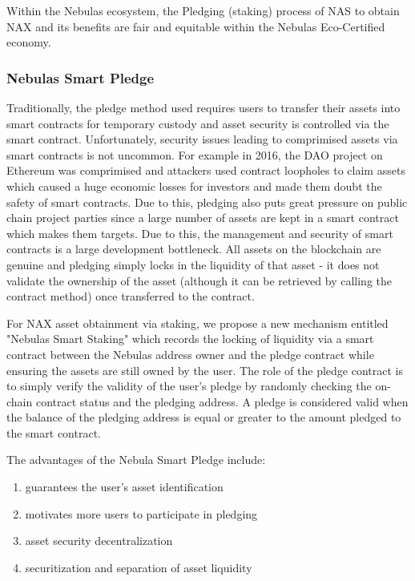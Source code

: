 Within the Nebulas ecosystem, the Pledging (staking) process of NAS to obtain NAX and its benefits are fair and equitable within the Nebulas Eco-Certified economy.

\subsubsection{Nebulas Smart Pledge}
Traditionally, the pledge method used requires users to transfer their assets into smart contracts for temporary custody and asset security is controlled via the smart contract. Unfortunately, security issues leading to comprimised assets via smart contracts is not uncommon. For example in 2016, the DAO project on Ethereum was comprimised and attackers used contract loopholes to claim assets which caused a huge economic losses for investors and made them doubt the safety of smart contracts. Due to this, pledging also puts great pressure on public chain project parties since a large number of assets are kept in a smart contract which makes them targets. Due to this, the management and security of smart contracts is a large development bottleneck. All assets on the blockchain are genuine and pledging simply locks in the liquidity of that asset - it does not validate the ownership of the asset (although it can be retrieved by calling the contract method) once transferred to the contract.

For NAX asset obtainment via staking, we propose a new mechanism entitled "Nebulas Smart Staking" which records the locking of liquidity via a smart contract between the Nebulas address owner and the pledge contract while ensuring the assets are still owned by the user. The role of the pledge contract is to simply verify the validity of the user's pledge by randomly checking the on-chain contract status and the pledging address. A  pledge is considered valid when the balance of the pledging address is equal or greater to the amount pledged to the smart contract.

The advantages of the Nebula Smart Pledge include:
\begin{enumerate}[\hspace{2cm}(a)]
    \item guarantees the user's asset identification
    \item motivates more users to participate in pledging
    \item asset security decentralization
    \item securitization and separation of asset liquidity
\end{enumerate}

